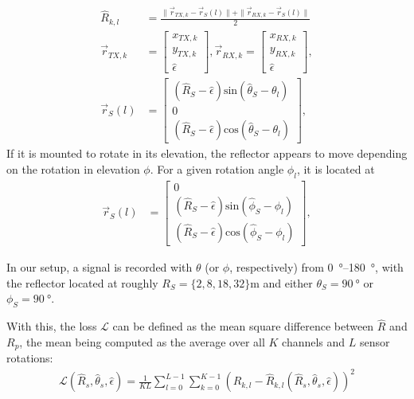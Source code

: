 \begin{align}
    \hat R_{k,l}   & = \frac{\| \vec r_{TX,k} - \vec r_S(l) \|+\| \vec r_{RX,k} - \vec r_S(l) \|}{2}
    \\
    \vec{r}_{TX,k} & = \begin{bmatrix}
                           x_{TX,k} \\ y_{TX,k} \\ \hat \epsilon
                       \end{bmatrix},
    \vec r_{RX,k}       = \begin{bmatrix}
                              x_{RX,k} \\ y_{RX,k} \\ \hat \epsilon
                          \end{bmatrix},                                                                                        \\
    \vec r_S(l)    & = \begin{bmatrix}
                           (\hat R_S-\hat \epsilon) \text{sin}(\hat \theta_S-\theta_l) \\ 0 \\ (\hat R_S-\hat \epsilon) \text{cos}(\hat \theta_S-\theta_l)
                       \end{bmatrix},
\end{align}
If it is mounted to rotate in its elevation, the reflector appears to move depending on the rotation in elevation $\phi$.
For a given rotation angle $\phi_l$, it is located at
\begin{align}
    \vec r_S(l) & = \begin{bmatrix}
                        0 \\ (\hat R_S-\hat \epsilon) \text{sin}(\hat \phi_S-\phi_l) \\ (\hat R_S-\hat \epsilon) \text{cos}(\hat \phi_S-\phi_l)
                    \end{bmatrix},
\end{align}

In our setup, a signal is recorded with $\theta$ (or $\phi$, respectively) from \SIrange{0}{180}{\degree},
with the reflector located at roughly $R_S = \{2,8,18,32\}\si{\meter}$ and either $\theta_S = \SI{90}{\degree}$ or $\phi_S = \SI{90}{\degree}$.


With this, the loss $\mathcal L$ can be defined as the mean square difference between $\hat R$ and $R_{p}$,
the mean being computed as the average over all $K$ channels and $L$ sensor rotations:
\begin{align}
    \mathcal L(\hat R_s, \hat \theta_s, \hat \epsilon)
    = \frac{1}{KL}\sum_{l=0}^{L-1} \sum_{k=0}^{K-1} ( R_{k,l} - \hat  R_{k,l}(\hat R_s, \hat \theta_s, \hat \epsilon))^2
\end{align} \\

